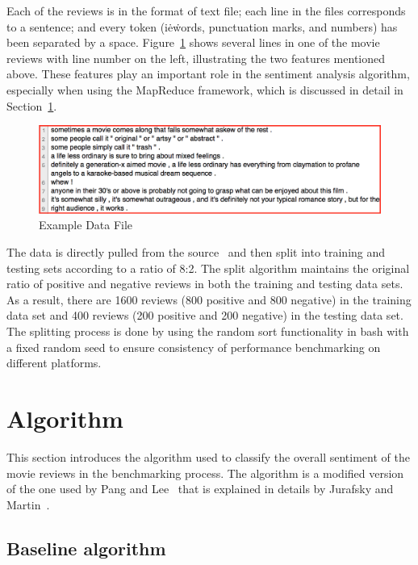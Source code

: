 Each of the reviews is in the format of text file; each line in the
files corresponds to a sentence; and every token (i\.e\. words,
punctuation marks, and numbers) has been separated by a
space. Figure~\ref{f:data} shows several lines in one of the movie
reviews with line number on the left, illustrating the two features
mentioned above. These features play an important role in the
sentiment analysis algorithm, especially when using the MapReduce
framework, which is discussed in detail in Section~\ref{s:algorithm}.
\begin{figure}[!ht]
	\centering\includegraphics[width=\columnwidth]{images/polarity-data.png}
	\caption{Example Data 
	File~\cite{hid-sp18-405-sentiment-data}}\label{f:data}
\end{figure}

The data is directly pulled from the
source~\cite{hid-sp18-405-sentiment-data} and then split into training
and testing sets according to a ratio of 8:2. The split algorithm
maintains the original ratio of positive and negative reviews in both
the training and testing data sets. As a result, there are 1600
reviews (800 positive and 800 negative) in the training data set and
400 reviews (200 positive and 200 negative) in the testing data
set. The splitting process is done by using the random sort
functionality in bash with a fixed random seed to ensure consistency
of performance benchmarking on different platforms.


\section{Algorithm}\label{s:algorithm}

This section introduces the algorithm used to classify the overall
sentiment of the movie reviews in the benchmarking process. The
algorithm is a modified version of the one used by Pang and
Lee~\cite{hid-sp18-405-sentiment-pang2004asentimental} that is
explained in details by Jurafsky and
Martin~\cite{hid-sp18-405-sentiment-jurafsky2009}.

\subsection{Baseline algorithm}\label{ss:base}

